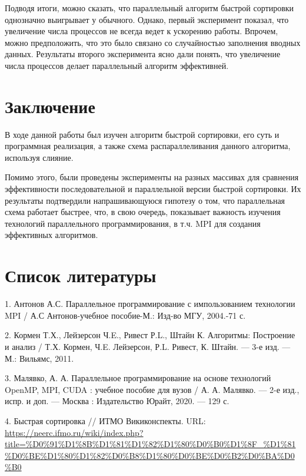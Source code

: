 \documentclass{report}
\begin{document}
Подводя итоги, можно сказать, что параллельный алгоритм быстрой сортировки однозначно выигрывает у обычного. Однако, первый эксперимент показал, что увеличение числа процессов не всегда ведет к ускорению работы. Впрочем, можно предположить, что это было связано со случайностью заполнения вводных данных. Результаты второго эксперимента ясно дали понять, что увеличение числа процессов делает параллельный алгоритм эффективней.

\newpage

\section*{Заключение}  

В ходе данной работы был изучен алгоритм быстрой сортировки, его суть и программная реализация, а также схема распараллеливания данного алгоритма, используя слияние.

Помимо этого, были проведены эксперименты на разных массивах для сравнения эффективности последовательной и параллельной версии быстрой сортировки. Их результаты подтвердили напрашивающуюся гипотезу о том, что параллельная схема работает быстрее, что, в свою очередь, показывает важность изучения технологий параллельного программирования, в т.ч. MPI для создания эффективных алгоритмов.

\newpage

\section*{Список литературы}  

1. Антонов А.С. Параллельное программирование с импользованием технологии MPI / А.С Антонов-учебное пособие-М.: Изд-во МГУ, 2004.-71 с.

2. Кормен Т.Х., Лейзерсон Ч.E., Ривест Р.L., Штайн К. Алгоритмы: Построение и анализ / Т.Х.
Кормен, Ч.E. Лейзерсон, Р.L. Ривест, К. Штайн. — 3-е изд. — М.: Вильямс, 2011.

3. Малявко, А. А.  Параллельное программирование на основе технологий OpenMP, MPI, CUDA : учебное пособие для вузов / А. А. Малявко. — 2-е изд., испр. и доп. — Москва : Издательство Юрайт, 2020. — 129 с.

4. Быстрая сортировка // ИТМО Викиконспекты. URL: \url{https://neerc.ifmo.ru/wiki/index.php?title=%D0%91%D1%8B%D1%81%D1%82%D1%80%D0%B0%D1%8F_%D1%81%D0%BE%D1%80%D1%82%D0%B8%D1%80%D0%BE%D0%B2%D0%BA%D0%B0}
\end{document}
